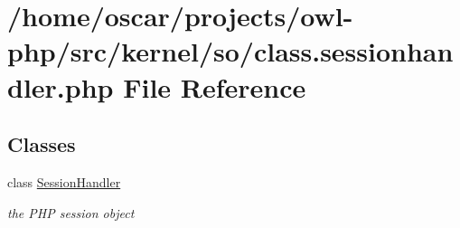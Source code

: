 \section{/home/oscar/projects/owl-\/php/src/kernel/so/class.sessionhandler.php File Reference}
\label{class_8sessionhandler_8php}
\subsection*{Classes}
\begin{DoxyCompactItemize}
\item 
class \hyperlink{classSessionHandler}{SessionHandler}
\begin{DoxyCompactList}\small\item\em the PHP session object \item\end{DoxyCompactList}\end{DoxyCompactItemize}
